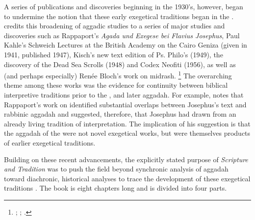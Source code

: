 A series of publications and discoveries beginning in the 1930's, however, began to undermine the notion that these early exegetical traditions began in the . \vermes credits this broadening of aggadic studies to a series of major studies and discoveries such as Rappaport's \emph{Agada und Exegese bei Flavius Josephus},%
    \autocite{rappaport1930}
Paul Kahle's Schweich Lectures at the British Academy on the Cairo Geniza (given in 1941, published 1947),%
    \autocite{kahle1947}
Kisch's new text edition of Ps. Philo's \lab (1949),%
    \autocite{kisch1949}
the discovery of the Dead Sea Scrolls (1948) and Codex Neofiti (1956), as well as (and perhaps especially) Renée Bloch's work on midrash.%
    \footnote{%
        \Cite{bloch1954};
        \cite{bloch1955_repr};
        \cite[3--7]{vermes1961}.}
The overarching theme among these works was the evidence for continuity between biblical interpretive traditions prior to the , and later aggadah. For example, \vermes notes that Rappaport's work on \ant identified substantial overlaps between Josephus's text and rabbinic aggadah and suggested, therefore, that Josephus had drawn from an already living tradition of interpretation. The implication of his suggestion is that the aggadah of the  were not novel exegetical works, but were themselves products of earlier exegetical traditions. 

Building on these recent advancements, the explicitly stated purpose of \emph{Scripture and Tradition} was to push the field beyond synchronic analysis of aggadah toward diachronic, historical analyses to trace the development of these exegetical traditions \autocites[1]{vermes1961}[See also][]{bloch1955_repr}. The book is eight chapters long and is divided into four parts. 

